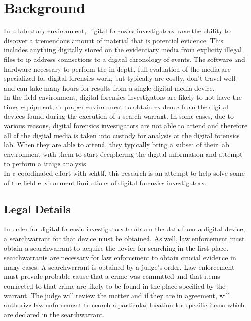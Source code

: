 \documentclass[12pt]{article}
\begin{document}
\section{Background}
\label{sect-background}

In a labratory environment, digital forensics investigators have the ability to discover
a tremendous amount of material that is potential evidence.  This includes anything 
digitally stored on the evidentiary media from
explicity illegal files to \gls{ip} address connections to a digital chronology of
events.\cite{raghavan2013digital}\cite{rogers2006computer}
The software and hardware necessary to perform the
in-depth, full evaluation of the media are specialized for digital forensics 
work, but typically are costly, don't travel well, and can take many hours for
results from a single digital media device.\\

In the field environment, digital forensics
investigators are likely to not have the time, equipment, or proper environment to
obtain evidence from the digital devices found during the execution of a search
warrant.  In some cases, due to various reasons, digital forensics investigators
are not able to attend and therefore all of the digital media is taken into
custody for analysis at the digital forensics lab.  When they are able to attend,
they typically
bring a subset of their lab environment with them to start deciphering
the digital information and attempt to perform a traige analysis.\\

In a coordinated effort with \gls{schttf}, this research is an attempt to help
solve some of the field environment limitations of digital forensics investigators.


\subsection{Legal Details}
In order for digital forensic investigators to obtain the data from a digital device,
a \gls{searchwarrant} for that device must be obtained.  As well, law enforcement must
obtain a \gls{searchwarrant} to acquire the device for searching in the first place.\\

\Gls{searchwarrant}s are necessary for law enforcement to obtain crucial evidence in many
cases.  A \gls{searchwarrant} is obtained by a judge's order.  Law enforcement must 
provide probable cause that a crime 
was committed and that items connected to that crime are likely to be found 
in the place specified by the warrant.  The judge will review the matter and if
they are in agreement, will authorize law enforcement to search a particular location
for specific items which are declared in the \gls{searchwarrant}.\\
\end{document}
